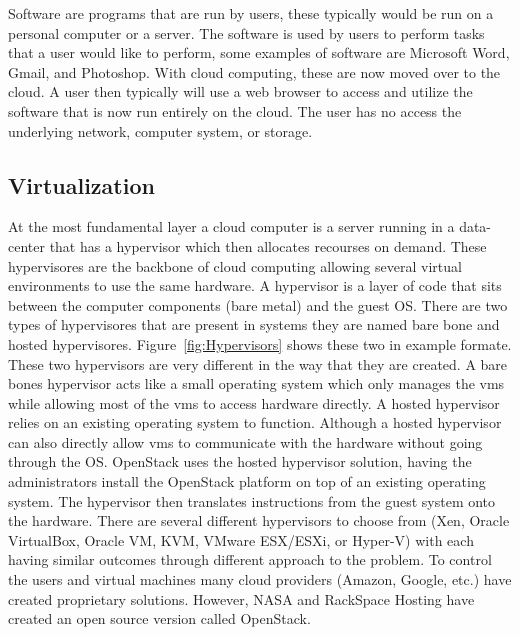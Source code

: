 \documentclass[12pt]{article}
\begin{document}
\begin{itemize}
        Software are programs that are run by users, these typically would be run on a personal computer or a server. The software is used by users to perform tasks that a user would like to perform, some examples of software are Microsoft Word, Gmail, and Photoshop. With cloud computing, these are now moved over to the cloud. A user then typically will use a web browser to access and utilize the software that is now run entirely on the cloud. The user has no access the underlying network, computer system, or storage.


\end{itemize}

\subsection{Virtualization}
At the most fundamental layer a cloud computer is a server running in a data-center that has a hypervisor which then allocates recourses on demand. These hypervisores are the backbone of cloud computing allowing several virtual environments to use the same hardware. A hypervisor is a layer of code that sits between the computer components (bare metal) and the guest OS\@. There are two types of hypervisores that are present in systems they are named bare bone and hosted hypervisores. Figure~\ref{fig:Hypervisors} shows these two in example formate. These two hypervisors are very different in the way that they are created.  A bare bones hypervisor acts like a small operating system which only manages the vms while allowing most of the vms to access hardware directly. A hosted hypervisor relies on an existing operating system to function. Although a hosted hypervisor can also directly allow vms to communicate with the hardware without going through the OS\@. OpenStack uses the hosted hypervisor solution, having the administrators install the OpenStack platform on top of an existing operating system.   The hypervisor then translates instructions from the guest system onto the hardware. There are several different hypervisors to choose from (Xen, Oracle VirtualBox, Oracle VM, KVM, VMware ESX/ESXi, or Hyper-V) with each having similar outcomes through different approach to the problem. To control the users and virtual machines many cloud providers (Amazon, Google, etc.) have created proprietary solutions. However, NASA and RackSpace Hosting \cite{wikipedia1} have created an open source version called OpenStack.
\end{document}
